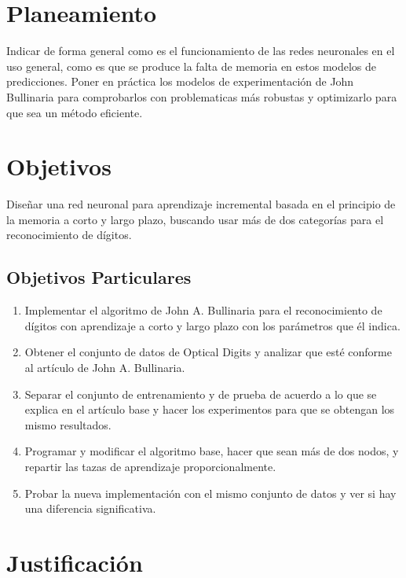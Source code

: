 \section{Planeamiento}

    Indicar de forma general como es el funcionamiento de las redes neuronales en el uso general, como es que se produce la falta de memoria en 
    estos modelos de predicciones. Poner en pr\'actica los modelos de experimentación de John Bullinaria para comprobarlos con
    problematicas m\'as robustas y optimizarlo para que sea un m\'etodo eficiente.
    
\section{Objetivos}
    Diseñar una red neuronal para aprendizaje incremental basada en el principio de la memoria a corto y largo plazo, buscando usar más de dos categorías para el reconocimiento de dígitos.
    \subsection{Objetivos Particulares}
        \begin{enumerate}
            \item Implementar el algoritmo de John A. Bullinaria para el reconocimiento de dígitos con aprendizaje a corto y largo plazo con los parámetros que él indica.
            \item Obtener el conjunto de datos de Optical Digits y analizar que esté conforme al artículo de John A. Bullinaria.
            \item Separar el conjunto de entrenamiento y de prueba de acuerdo a lo que se explica en el artículo base y hacer los experimentos para que se obtengan los mismo resultados.
            \item Programar y modificar el algoritmo base, hacer que sean más de dos nodos, y repartir las tazas de aprendizaje proporcionalmente.
            \item Probar la nueva implementación con el mismo conjunto de datos y ver si hay una diferencia significativa.
        \end{enumerate}
\section{Justificaci\'on}

